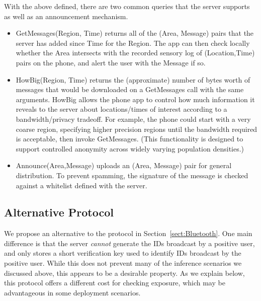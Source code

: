 \documentclass{article}
\begin{document}
With the above defined, there are two common queries that the server supports as well as an announcement mechanism.
\begin{itemize}
    \item GetMessages(Region, Time) returns all of the (Area, Message) pairs that the server has added since Time for the Region. The app can then check locally whether the Area intersects with the recorded sensory log of (Location,Time) pairs on the phone, and alert the user with the Message if so.   
    \item HowBig(Region, Time) returns the (approximate) number of bytes worth of messages that would be downloaded on a GetMessages call with the same arguments.  HowBig allows the phone app to control how much information it reveals to the server about locations/times of interest according to a bandwidth/privacy tradeoff.  For example, the phone could start with a very coarse region, specifying higher precision regions until the bandwidth required is acceptable, then invoke GetMessages.  (This functionality is designed to support controlled anonymity across widely varying population densities.)
    \item Announce(Area,Message) uploads an (Area, Message) pair for general distribution.  To prevent spamming, the signature of the message is checked against a whitelist defined with the server. 
\end{itemize}

\newcommand{\skey}{\mathrm{sk}}
\newcommand{\vkey}{\mathrm{vk}}
\newcommand{\Kg}{\mathsf{Kg}}
\newcommand{\Sign}{\mathsf{Sign}}
\newcommand{\Vrfy}{\mathsf{Vrfy}}
\newcommand{\gps}{\mathrm{coord}}

\subsection{Alternative Protocol}\label{sect:alternative}

We propose an alternative to the protocol in Section~\ref{sect:Bluetooth}. One main difference is that the server {\em cannot} generate the IDs broadcast by a positive user, and only stores a short verification key used to identify IDs broadcast by the positive user. While this does not prevent many of the inference scenarios we discussed above, this appears to be a desirable property. As we explain below, this protocol offers a different cost for checking exposure, which may be advantageous in some deployment scenarios.
\end{document}
